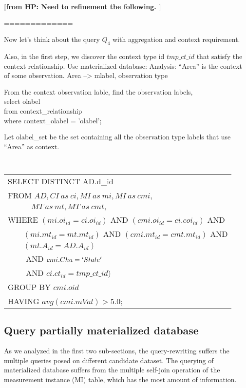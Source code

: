 \documentclass[conference]{IEEEtran}
\newcommand{\from}[2]{{\bf[{\sc from #1:} #2]}}
\begin{document}


\from{HP}{Need to refinement the following. }

=============

Now let's think about the query $Q_4$ with aggregation and context
requirement. 

Also, in the first step, we discover the context type id $tmp\_ct\_id$
that satisfy the context relationship. 
Use materialized database: 
Analysis: ``Area'' is the context of some observation.
Area --> mlabel, observation type

From the context observation lable, find the observation labels, \\
select olabel\\
from context\_relationship\\
where context\_olabel = 'olabel'; 

Let olabel\_set  be the set containing all the observation type
labels that use ``Area'' as context. 

\vspace{0.1in}
{\tt 
\begin{tabular}{l}
SELECT DISTINCT AD.d_{id} \\
FROM $AD, CI~as~ci, MI~as~mi, MI~as~cmi,$ \\
$\quad\qquad MT~as~mt, MT~as~cmt,$ \\
WHERE $(mi.oi_{id}=ci.oi_{id})$ AND $(cmi.oi_{id}=ci.coi_{id})$ AND\\
$\qquad (mi.mt_{id}=mt.mt_{id})$ AND $(cmi.mt_{id}=cmt.mt_{id})$ AND\\
$\qquad (mt.A_{id}=AD.A_{id})$\\
$\qquad$ AND $cmi.Cha=`State'$\\
$\qquad$ AND $ci.ct_{id} = tmp\_ct\_id)$\\
GROUP BY $cmi.oid$\\
HAVING $avg(cmi.mVal)>5.0$;
\end{tabular}
}
\vspace{0.1in}

\subsection{Query partially materialized database}
As we analyzed in the first two sub-sections, 
the query-rewriting suffers the multiple queries posed on different
candidate dataset. The querying of materialized database suffers from
the multiple self-join operation of the measurement instance (MI)
table, which has the most amount of information. 
\end{document}

